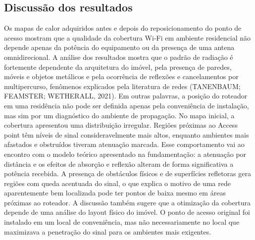 \subsection{Discussão dos resultados}

Os mapas de calor adquiridos antes e depois do reposicionamento do ponto de acesso mostram que a qualidade da cobertura Wi-Fi em ambiente
residencial não depende apenas da potência do equipamento ou da presença de uma antena omnidirecional.
A análise dos resultados mostra que o padrão de radiação é fortemente dependente da arquitetura do imóvel, pela presença de paredes,
móveis e objetos metálicos e pela ocorrência de reflexões e cancelamentos por multipercurso, fenômenos explicados pela literatura de redes (TANENBAUM; FEAMSTER; WETHERALL, 2021).
Em outras palavras, a posição do roteador em uma residência não pode ser definida apenas pela conveniência de instalação,
mas sim por um diagnóstico do ambiente de propagação.
No mapa inicial, a cobertura apresentou uma distribuição irregular. Regiões próximas ao Access point têm níveis de sinal consideravelmente mais altos,
enquanto ambientes mais afastados e obstruídos tiveram atenuação marcada.
Esse comportamento vai ao encontro com o modelo teórico apresentado na fundamentação: a atenuação por distância e os efeitos de absorção 
e reflexão alteram de forma significativa a potência recebida. A presença de obstáculos físicos e de superfícies refletoras gera regiões com queda acentuada do sinal, 
o que explica o motivo de uma rede aparentemente bem localizada pode ter pontos de baixa mesmo em áreas próximas ao roteador.
A discussão também sugere que a otimização da cobertura depende de uma análise do layout físico do imóvel. 
O ponto de acesso original foi instalado em um local de conveniência, mas não necessariamente no local que maximizava a penetração do sinal para os ambientes mais exigentes.
